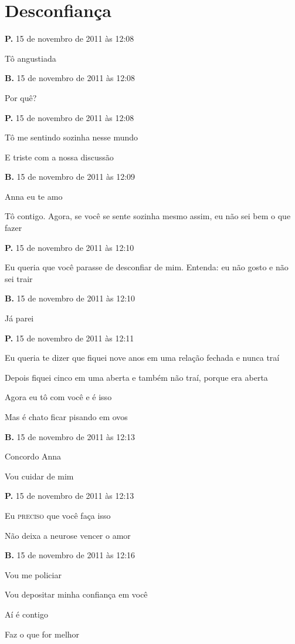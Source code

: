 \chapter{Desconfiança}

{\parindent0pt\parskip1pt\raggedright
\textbf{P.} 15 de novembro de 2011 às 12:08

Tô angustiada

\textbf{B.} 15 de novembro de 2011 às 12:08

Por quê?

\textbf{P.} 15 de novembro de 2011 às 12:08

Tô me sentindo sozinha nesse mundo

E triste com a nossa discussão

\textbf{B.} 15 de novembro de 2011 às 12:09

Anna eu te amo

Tô contigo. Agora, se você se sente sozinha mesmo assim, eu não sei bem
o que fazer

\textbf{P.} 15 de novembro de 2011 às 12:10

Eu queria que você parasse de desconfiar de mim. Entenda: eu não gosto e
não sei trair

\textbf{B.} 15 de novembro de 2011 às 12:10

Já parei

\textbf{P.} 15 de novembro de 2011 às 12:11

Eu queria te dizer que fiquei nove anos em uma relação fechada e nunca
traí

Depois fiquei cinco em uma aberta e também não traí, porque era aberta

Agora eu tô com você e é isso

Mas é chato ficar pisando em ovos

\textbf{B.} 15 de novembro de 2011 às 12:13

Concordo Anna

Vou cuidar de mim

\textbf{P.} 15 de novembro de 2011 às 12:13

Eu \textsc{preciso} que você faça isso

Não deixa a neurose vencer o amor

\textbf{B.} 15 de novembro de 2011 às 12:16

Vou me policiar

Vou depositar minha confiança em você

Aí é contigo

Faz o que for melhor

}
